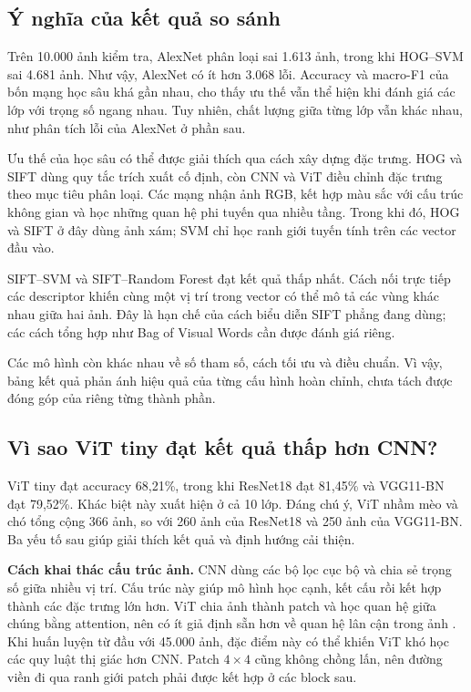 \subsection{Ý nghĩa của kết quả so sánh}
Trên 10.000 ảnh kiểm tra, AlexNet phân loại sai 1.613 ảnh, trong khi
HOG--SVM sai 4.681 ảnh. Như vậy, AlexNet có ít hơn 3.068 lỗi.
Accuracy và macro-F1 của bốn mạng học sâu khá gần nhau, cho thấy ưu thế
vẫn thể hiện khi đánh giá các lớp với trọng số ngang nhau. Tuy nhiên, chất lượng
giữa từng lớp vẫn khác nhau, như phân tích lỗi của AlexNet ở phần sau.

Ưu thế của học sâu có thể được giải thích qua cách xây dựng đặc trưng.
HOG và SIFT dùng quy tắc trích xuất cố định, còn CNN và ViT điều chỉnh
đặc trưng theo mục tiêu phân loại. Các mạng nhận ảnh RGB, kết hợp màu sắc
với cấu trúc không gian và học những quan hệ phi tuyến qua nhiều tầng.
Trong khi đó, HOG và SIFT ở đây dùng ảnh xám; SVM chỉ học ranh giới tuyến
tính trên các vector đầu vào.

SIFT--SVM và SIFT--Random Forest đạt kết quả thấp nhất. Cách nối trực tiếp
các descriptor khiến cùng một vị trí trong vector có thể mô tả các vùng
khác nhau giữa hai ảnh. Đây là hạn chế của cách biểu diễn SIFT phẳng đang
dùng; các cách tổng hợp như Bag of Visual Words cần được đánh giá riêng.

Các mô hình còn khác nhau về số tham số, cách tối ưu và điều chuẩn. Vì vậy,
bảng kết quả phản ánh hiệu quả của từng cấu hình hoàn chỉnh, chưa tách được
đóng góp của riêng từng thành phần.

\subsection{Vì sao ViT tiny đạt kết quả thấp hơn CNN?}
ViT tiny đạt accuracy 68,21\%, trong khi ResNet18 đạt 81,45\% và VGG11-BN
đạt 79,52\%. Khác biệt này xuất hiện ở cả 10 lớp. Đáng chú ý, ViT nhầm
mèo và chó tổng cộng 366 ảnh, so với 260 ảnh của ResNet18 và 250 ảnh của
VGG11-BN. Ba yếu tố sau giúp giải thích kết quả và định hướng cải thiện.

\textbf{Cách khai thác cấu trúc ảnh.} CNN dùng các bộ lọc cục bộ và chia sẻ
trọng số giữa nhiều vị trí. Cấu trúc này giúp mô hình học cạnh, kết cấu rồi
kết hợp thành các đặc trưng lớn hơn. ViT chia ảnh thành patch và học quan
hệ giữa chúng bằng attention, nên có ít giả định sẵn hơn về quan hệ lân cận
trong ảnh \cite{dosovitskiy2021vit}. Khi huấn luyện từ đầu với 45.000 ảnh,
đặc điểm này có thể khiến ViT khó học các quy luật thị giác hơn CNN.
Patch $4\times4$ cũng không chồng lấn, nên đường viền đi qua ranh giới
patch phải được kết hợp ở các block sau.

